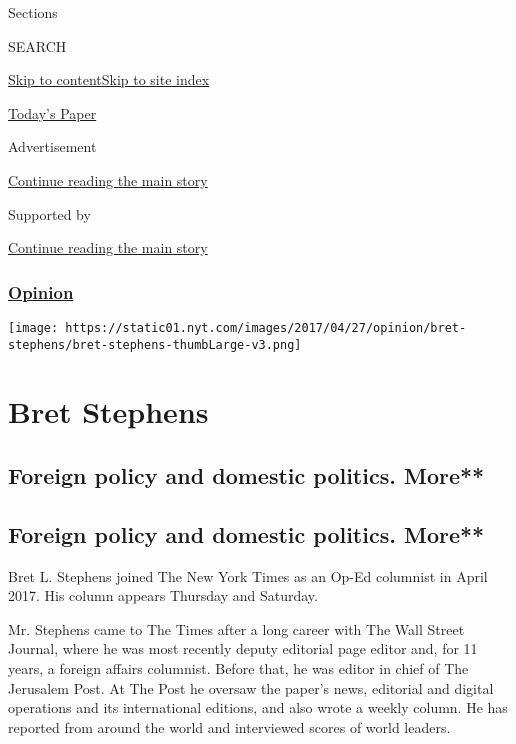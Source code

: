 Sections

SEARCH

\protect\hyperlink{site-content}{Skip to
content}\protect\hyperlink{site-index}{Skip to site index}

\href{https://myaccount.nytimes.com/auth/login?response_type=cookie\&client_id=vi}{}

\href{https://www.nytimes.com/section/todayspaper}{Today's Paper}

Advertisement

\protect\hyperlink{after-top}{Continue reading the main story}

Supported by

\protect\hyperlink{after-sponsor}{Continue reading the main story}

\hypertarget{opinion}{%
\subsubsection{\texorpdfstring{\href{/section/opinion}{Opinion}}{Opinion}}\label{opinion}}

\texttt{[image: https://static01.nyt.com/images/2017/04/27/opinion/bret-stephens/bret-stephens-thumbLarge-v3.png]}

\hypertarget{bret-stephens}{%
\section{Bret Stephens}\label{bret-stephens}}

\hypertarget{foreign-policy-and-domestic-politics-more}{%
\subsection{Foreign policy and domestic politics.
More**}\label{foreign-policy-and-domestic-politics-more}}

\hypertarget{foreign-policy-and-domestic-politics-more-1}{%
\subsection{Foreign policy and domestic politics.
More**}\label{foreign-policy-and-domestic-politics-more-1}}

Bret L. Stephens joined The New York Times as an Op-Ed columnist in
April 2017. His column appears Thursday and Saturday.

Mr. Stephens came to The Times after a long career with The Wall Street
Journal, where he was most recently deputy editorial page editor and,
for 11 years, a foreign affairs columnist. Before that, he was editor in
chief of The Jerusalem Post. At The Post he oversaw the paper's news,
editorial and digital operations and its international editions, and
also wrote a weekly column. He has reported from around the world and
interviewed scores of world leaders.

